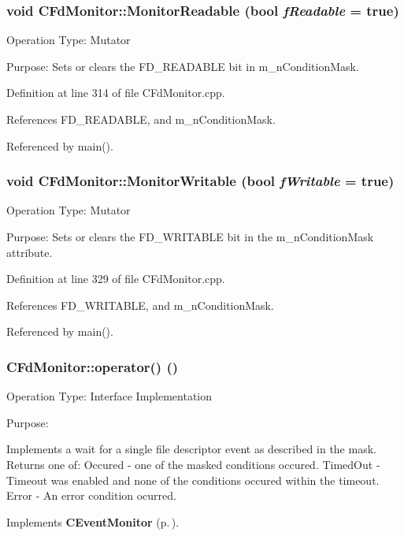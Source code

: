 \subsubsection{\setlength{\rightskip}{0pt plus 5cm}void CFd\-Monitor::Monitor\-Readable (bool {\em f\-Readable} = true)}\label{classCFdMonitor_a8}


Operation Type: Mutator

Purpose: Sets or clears the FD\_\-READABLE bit in m\_\-n\-Condition\-Mask. 

Definition at line 314 of file CFd\-Monitor.cpp.

References FD\_\-READABLE, and m\_\-n\-Condition\-Mask.

Referenced by main().
\subsubsection{\setlength{\rightskip}{0pt plus 5cm}void CFd\-Monitor::Monitor\-Writable (bool {\em f\-Writable} = true)}\label{classCFdMonitor_a9}


Operation Type: Mutator

Purpose:  Sets or clears the FD\_\-WRITABLE bit in the m\_\-n\-Condition\-Mask attribute. 

Definition at line 329 of file CFd\-Monitor.cpp.

References FD\_\-WRITABLE, and m\_\-n\-Condition\-Mask.

Referenced by main().
\subsubsection{ CFd\-Monitor::operator() ()\hspace{0.3cm}{\tt  [virtual]}}\label{classCFdMonitor_a11}


Operation Type: Interface Implementation

Purpose:

Implements a wait for a single file descriptor event as described in the mask. Returns one of: Occured - one of the masked conditions occured. Timed\-Out - Timeout was enabled and none of the conditions occured within the timeout. Error - An error condition ocurred. 

Implements {\bf CEvent\-Monitor} {\rm (p.\,\pageref{classCEventMonitor_a7})}.

